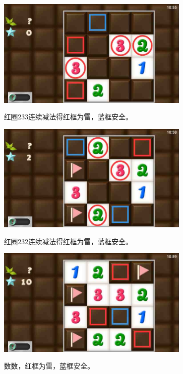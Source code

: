 \subsection{} %
\begin{center}
    \includegraphics[width=0.7\textwidth]{puzzlelow/124-1.jpg}
\end{center}
红圈233连续减法得红框为雷，蓝框安全。
\begin{center}
    \includegraphics[width=0.7\textwidth]{puzzlelow/124-2.jpg}
\end{center}
红圈232连续减法得红框为雷，蓝框安全。
\begin{center}
    \includegraphics[width=0.7\textwidth]{puzzlelow/124-3.jpg}
\end{center}
数数，红框为雷，蓝框安全。

